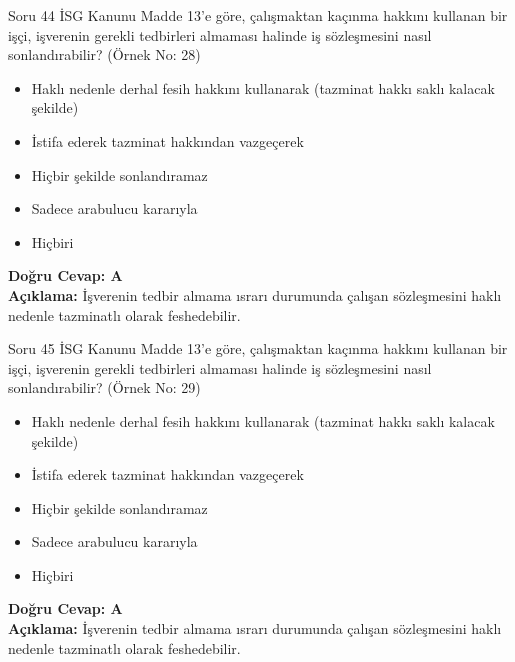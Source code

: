 \documentclass[12pt,a4paper]{article}
\begin{document}
\begin{testcard}{Soru 44}
    İSG Kanunu Madde 13'e göre, çalışmaktan kaçınma hakkını kullanan bir işçi, işverenin gerekli tedbirleri almaması halinde iş sözleşmesini nasıl sonlandırabilir? (Örnek No: 28)
    \begin{itemize}
        \item[A)] Haklı nedenle derhal fesih hakkını kullanarak (tazminat hakkı saklı kalacak şekilde)
        \item[B)] İstifa ederek tazminat hakkından vazgeçerek
        \item[C)] Hiçbir şekilde sonlandıramaz
        \item[D)] Sadece arabulucu kararıyla
        \item[E)] Hiçbiri
    \end{itemize}
    \tcblower
    \textbf{Doğru Cevap: A} \\
    \textbf{Açıklama:} İşverenin tedbir almama ısrarı durumunda çalışan sözleşmesini haklı nedenle tazminatlı olarak feshedebilir.
\end{testcard}

\begin{testcard}{Soru 45}
    İSG Kanunu Madde 13'e göre, çalışmaktan kaçınma hakkını kullanan bir işçi, işverenin gerekli tedbirleri almaması halinde iş sözleşmesini nasıl sonlandırabilir? (Örnek No: 29)
    \begin{itemize}
        \item[A)] Haklı nedenle derhal fesih hakkını kullanarak (tazminat hakkı saklı kalacak şekilde)
        \item[B)] İstifa ederek tazminat hakkından vazgeçerek
        \item[C)] Hiçbir şekilde sonlandıramaz
        \item[D)] Sadece arabulucu kararıyla
        \item[E)] Hiçbiri
    \end{itemize}
    \tcblower
    \textbf{Doğru Cevap: A} \\
    \textbf{Açıklama:} İşverenin tedbir almama ısrarı durumunda çalışan sözleşmesini haklı nedenle tazminatlı olarak feshedebilir.
\end{testcard}
\end{document}
